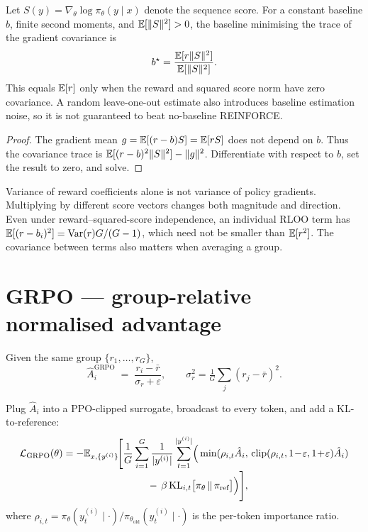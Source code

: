 \documentclass[11pt,oneside]{scrbook}
\begin{document}
\begin{theorem}
\label{thm:rloo-varred}
Let $S(y)=\nabla_\theta\log\pi_\theta(y\mid x)$ denote the sequence score.
For a constant baseline $b$, finite second moments, and $\mathbb{E}[\|S\|^2]>0$,
the baseline minimising the trace of the gradient covariance is
\[
 b^\star=\frac{\mathbb{E}[r\|S\|^2]}{\mathbb{E}[\|S\|^2]}.
\]
This equals $\mathbb{E}[r]$ only when the reward and squared score norm have
zero covariance. A random leave-one-out estimate also introduces baseline
estimation noise, so it is not guaranteed to beat no-baseline REINFORCE.
\end{theorem}
\begin{proof}
The gradient mean $g=\mathbb{E}[(r-b)S]=\mathbb{E}[rS]$ does not depend on $b$.
Thus the covariance trace is $\mathbb{E}[(r-b)^2\|S\|^2]-\|g\|^2$.
Differentiate with respect to $b$, set the result to zero, and solve.
\end{proof}
\begin{pitfall}
Variance of reward coefficients alone is not variance of policy gradients.
Multiplying by different score vectors changes both magnitude and direction.
Even under reward--squared-score independence, an individual RLOO term has
$\mathbb{E}[(r-b_i)^2]=\mathrm{Var}(r)G/(G-1)$, which need not be smaller than
$\mathbb{E}[r^2]$. The covariance between terms also matters when averaging a group.
\end{pitfall}

\section{GRPO --- group-relative normalised advantage}

\begin{definition}
Given the same group $\{r_1,\dots,r_G\}$,
\[
  \hat A_i^{\text{GRPO}} \;=\; \frac{r_i - \bar r}{\sigma_r + \varepsilon},
  \qquad \sigma_r^2 = \tfrac{1}{G}\sum_j (r_j - \bar r)^2.
\]
\end{definition}


Plug $\hat A_i$ into a PPO-clipped surrogate, broadcast to every token,
and add a KL-to-reference:
\begin{equation}\label{eq:grpo}
\begin{aligned}
  \mathcal{L}_{\text{GRPO}}(\theta)
  &= -\mathbb{E}_{x, \{y^{(i)}\}}\!\Bigg[\frac{1}{G}\sum_{i=1}^{G}\frac{1}{|y^{(i)}|}\sum_{t=1}^{|y^{(i)}|}\!\Big( \min(\rho_{i,t}\hat A_i,\, \mathrm{clip}(\rho_{i,t}, 1\!-\!\varepsilon, 1\!+\!\varepsilon)\hat A_i) \\[-2pt]
  &\hspace{8.5em}-\, \beta\, \mathrm{KL}_{i,t}\big[\pi_\theta \,\|\, \pi_{\text{ref}}\big] \Big)\Bigg],
\end{aligned}
\end{equation}
where $\rho_{i,t} = \pi_\theta(y_t^{(i)} \mid \cdot) / \pi_{\theta_{\text{old}}}(y_t^{(i)} \mid \cdot)$
is the per-token importance ratio.
\end{document}
